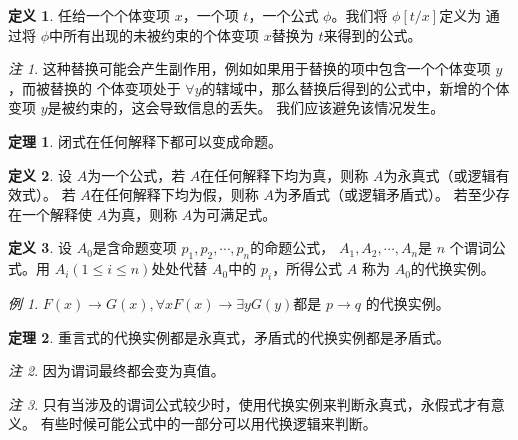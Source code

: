 \documentclass[a4paper,11pt]{article}%
\theoremstyle{remark}
\newtheorem*{remark}{注}
\theoremstyle{remark}
\newtheorem*{example}{例}
\theoremstyle{definition}
\newtheorem{theorem}{定理}[section]
\theoremstyle{definition}
\newtheorem*{definition}{定义}
\theoremstyle{plain}
\begin{document}
\begin{definition}
    任给一个个体变项 $x$，一个项 $t$，一个公式 $\phi$。我们将 $\phi[t/x]$定义为
    通过将 $\phi$中所有出现的未被约束的个体变项 $x$替换为 $t$来得到的公式。
\end{definition}
\begin{remark}
    这种替换可能会产生副作用，例如如果用于替换的项中包含一个个体变项 $y$，而被替换的
    个体变项处于 $\forall y$的辖域中，那么替换后得到的公式中，新增的个体变项 $y$是被约束的，这会导致信息的丢失。
    我们应该避免该情况发生。
\end{remark}
\begin{theorem}
    闭式在任何解释下都可以变成命题。
\end{theorem}
\begin{definition}
    设 $A$为一个公式，若 $A$在任何解释下均为真，则称 $A$为永真式（或逻辑有效式）。
    若 $A$在任何解释下均为假，则称 $A$为矛盾式（或逻辑矛盾式）。
    若至少存在一个解释使 $A$为真，则称 $A$为可满足式。
\end{definition}
\begin{definition}
    设 $A_0$是含命题变项 $p_1,p_2,\cdots,p_n$的命题公式， $A_1,A_2,\cdots,A_n$是 $n$
    个谓词公式。用 $A_i(1\leq i\leq n)$处处代替 $A_0$中的 $p_i$，所得公式 $A$
    称为 $A_0$的代换实例。
\end{definition}
\begin{example}
    $F(x)\rightarrow G(x),\forall x F(x)\rightarrow\exists y G(y)$都是 $p\rightarrow q$
    的代换实例。
\end{example}
\begin{theorem}
    重言式的代换实例都是永真式，矛盾式的代换实例都是矛盾式。
\end{theorem}
\begin{remark}
    因为谓词最终都会变为真值。
\end{remark}
\begin{remark}
    只有当涉及的谓词公式较少时，使用代换实例来判断永真式，永假式才有意义。
    有些时候可能公式中的一部分可以用代换逻辑来判断。
\end{remark}
\end{document}
